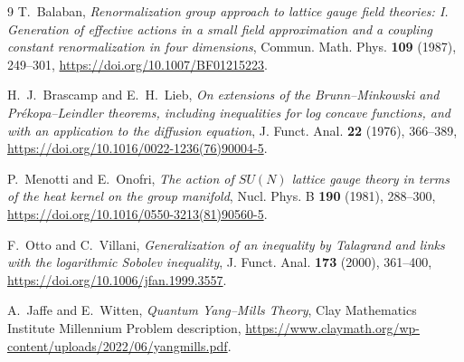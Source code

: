 \documentclass[11pt]{article}
\theoremstyle{definition}
\begin{document}
\begin{thebibliography}{9}
T.~Balaban,
\emph{Renormalization group approach to lattice gauge field theories: I.
Generation of effective actions in a small field approximation and a coupling
constant renormalization in four dimensions},
Commun. Math. Phys. \textbf{109} (1987), 249--301,
\url{https://doi.org/10.1007/BF01215223}.

H.~J.~Brascamp and E.~H.~Lieb,
\emph{On extensions of the Brunn--Minkowski and Pr\'ekopa--Leindler theorems,
including inequalities for log concave functions, and with an application to
the diffusion equation},
J. Funct. Anal. \textbf{22} (1976), 366--389,
\url{https://doi.org/10.1016/0022-1236(76)90004-5}.

P.~Menotti and E.~Onofri,
\emph{The action of $SU(N)$ lattice gauge theory in terms of the heat kernel on
the group manifold},
Nucl. Phys. B \textbf{190} (1981), 288--300,
\url{https://doi.org/10.1016/0550-3213(81)90560-5}.

F.~Otto and C.~Villani,
\emph{Generalization of an inequality by Talagrand and links with the
logarithmic Sobolev inequality},
J. Funct. Anal. \textbf{173} (2000), 361--400,
\url{https://doi.org/10.1006/jfan.1999.3557}.

A.~Jaffe and E.~Witten,
\emph{Quantum Yang--Mills Theory}, Clay Mathematics Institute Millennium
Problem description,
\url{https://www.claymath.org/wp-content/uploads/2022/06/yangmills.pdf}.
\end{thebibliography}
\end{document}
